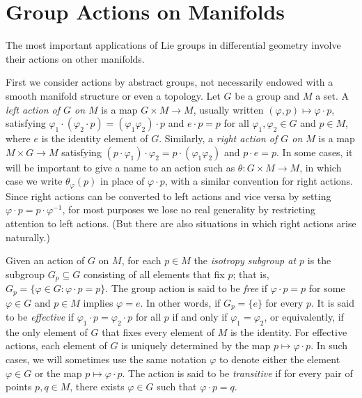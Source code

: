 \section{Group Actions on Manifolds}

The most important applications of Lie groups in differential geometry involve their actions on other manifolds.

First we consider actions by abstract groups, not necessarily endowed with a smooth manifold structure or even a topology. Let $G$ be a group and $M$ a set. A \emph{left action of $G$ on $M$} is a map $G \times M \to M$, usually written $(\varphi, p) \mapsto \varphi \cdot p$, satisfying $\varphi_1 \cdot (\varphi_2 \cdot p) = (\varphi_1\varphi_2) \cdot p$ and $e \cdot p = p$ for all $\varphi_1, \varphi_2 \in G$ and $p \in M$, where $e$ is the identity element of $G$. Similarly, a \emph{right action of $G$ on $M$} is a map $M \times G \to M$ satisfying $(p \cdot \varphi_1) \cdot \varphi_2 = p \cdot (\varphi_1\varphi_2)$ and $p \cdot e = p$. In some cases, it will be important to give a name to an action such as $\theta: G \times M \to M$, in which case we write $\theta_\varphi(p)$ in place of $\varphi \cdot p$, with a similar convention for right actions. Since right actions can be converted to left actions and vice versa by setting $\varphi \cdot p = p \cdot \varphi^{-1}$, for most purposes we lose no real generality by restricting attention to left actions. (But there are also situations in which right actions arise naturally.)

Given an action of $G$ on $M$, for each $p \in M$ the \textit{isotropy subgroup at $p$} is the subgroup $G_p \subseteq G$ consisting of all elements that fix $p$; that is, $G_p = \{\varphi \in G : \varphi \cdot p = p\}$. The group action is said to be \textit{free} if $\varphi \cdot p = p$ for some $\varphi \in G$ and $p \in M$ implies $\varphi = e$. In other words, if $G_p = \{e\}$ for every $p$. It is said to be \textit{effective} if $\varphi_1 \cdot p = \varphi_2 \cdot p$ for all $p$ if and only if $\varphi_1 = \varphi_2$, or equivalently, if the only element of $G$ that fixes every element of $M$ is the identity. For effective actions, each element of $G$ is uniquely determined by the map $p \mapsto \varphi \cdot p$. In such cases, we will sometimes use the same notation $\varphi$ to denote either the element $\varphi \in G$ or the map $p \mapsto \varphi \cdot p$. The action is said to be \textit{transitive} if for every pair of points $p, q \in M$, there exists $\varphi \in G$ such that $\varphi \cdot p = q$.

